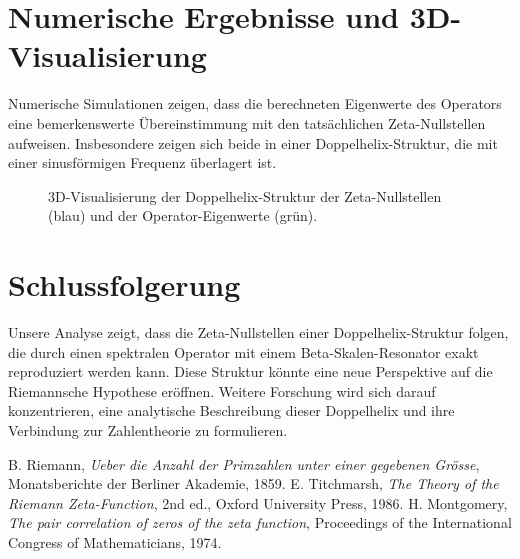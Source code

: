 \documentclass[a4paper,12pt]{article}
\begin{document}
\section{Numerische Ergebnisse und 3D-Visualisierung}
Numerische Simulationen zeigen, dass die berechneten Eigenwerte des Operators eine bemerkenswerte Übereinstimmung mit den tatsächlichen Zeta-Nullstellen aufweisen. Insbesondere zeigen sich beide in einer Doppelhelix-Struktur, die mit einer sinusförmigen Frequenz überlagert ist.

\begin{figure}[h!]
    \centering
    \caption{3D-Visualisierung der Doppelhelix-Struktur der Zeta-Nullstellen (blau) und der Operator-Eigenwerte (grün).}
    \label{fig:doppelhelix}
\end{figure}

\section{Schlussfolgerung}
Unsere Analyse zeigt, dass die Zeta-Nullstellen einer Doppelhelix-Struktur folgen, die durch einen spektralen Operator mit einem Beta-Skalen-Resonator exakt reproduziert werden kann. Diese Struktur könnte eine neue Perspektive auf die Riemannsche Hypothese eröffnen. Weitere Forschung wird sich darauf konzentrieren, eine analytische Beschreibung dieser Doppelhelix und ihre Verbindung zur Zahlentheorie zu formulieren.

\begin{thebibliography}{9}
 B. Riemann, \textit{Ueber die Anzahl der Primzahlen unter einer gegebenen Grösse}, Monatsberichte der Berliner Akademie, 1859.
 E. Titchmarsh, \textit{The Theory of the Riemann Zeta-Function}, 2nd ed., Oxford University Press, 1986.
 H. Montgomery, \textit{The pair correlation of zeros of the zeta function}, Proceedings of the International Congress of Mathematicians, 1974.
\end{thebibliography}
\end{document}
